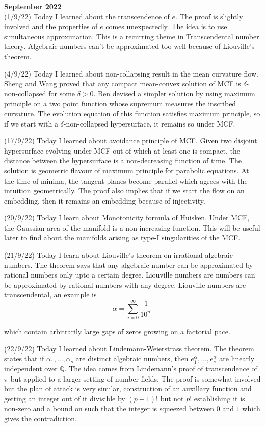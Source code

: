\documentclass[12pt,a4paper]{article}
\newcommand{\Q}{\mathbb{Q}}
\begin{document}
		\maketitle\textbf{September 2022}
	\\
	
	(1/9/22) Today I learned about the transcendence of $e$. The proof is slightly involved and the properties of $e$ comes unexpectedly. The idea is to use simultaneous approximation. This is a recurring theme in Transcendental number theory. Algebraic numbers can't be approximated too well because of Liouville's theorem. 
	
	(4/9/22) Today I learned about non-collapsing result in the mean curvature flow. Sheng and Wang proved that any compact mean-convex solution of MCF is $\delta$-non-collapsed for some $\delta >0$. Ben devised a simpler solution by using maximum principle on a two point function whose supremum measures the inscribed curvature. The evolution equation of this function satisfies maximum principle, so if we start with a $\delta$-non-collapsed hypersurface, it remains so under MCF.
	
	(17/9/22) Today I learned about avoidance principle of MCF. Given two disjoint hypersurface evolving under MCF out of which at least one is compact, the distance between the hypersurface is a non-decreasing function of time. The solution is geometric flavour of maximum principle for parabolic equations. At the time of minima, the tangent planes become parallel which agrees with the intuition geometrically. The proof also implies that if we start the flow on an embedding, then it remains an embedding because of injectivity.
	
	(20/9/22) Today I learn about Monotonicity formula of Huisken. Under MCF, the Gaussian area of the manifold is a non-increasing function. This will be useful later to find about the manifolds arising as type-I singularities of the MCF.
	
	(21/9/22) Today I learn about Liouville's theorem on irrational algebraic numbers. The theorem says that any algebraic number can be approximated by rational numbers only upto a certain degree. Liouville numbers are numbers can be approximated by rational numbers with any degree. Liouville numbers are transcendental, an example is 
	\[ \alpha = \sum_{i = 0}^{\infty} \frac{1}{10^{n!}} \]
	
	which contain arbitrarily large gaps of zeros growing on a factorial pace.
	
	(22/9/22) Today I learned about Lindemann-Weierstrass theorem. 
   The theorem states that if $\alpha_1, \ldots, \alpha_s$ are distinct algebraic numbers, then $e^\alpha_1, \ldots, e^\alpha_s$ are linearly independent over $\overline{\Q}$. 
   The idea comes from Lindemann's proof of transcendence of $\pi$ but applied to a larger setting of number fields. 
   The proof is somewhat involved but the plan of attack is very similar, construction of an auxillary function and getting an integer out of it divisible by $(p-1)!$ but not $p!$ establishing it is non-zero and a bound on such that the integer is squeezed between $0$ and $1$ which gives the contradiction.\\
\end{document}
